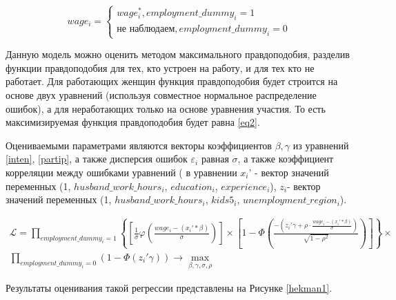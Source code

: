 \documentclass[a4paper,12pt]{article}
\begin{document}
\begin{equation*}
	wage_i= 
	\begin{cases}
		wage_i^*, 	employment\_dummy_i = 1 \\
		\text{не  наблюдаем}, employment\_dummy_i = 0
	\end{cases}
\end{equation*}

Данную модель можно оценить методом максимального правдоподобия, разделив функции правдоподобия для тех, кто устроен на работу, и для тех кто не работает. Для работающих женщин функция правдоподобия будет строится на основе двух уравнений (используя совместное нормальное распределение ошибок), а для неработающих только на основе уравнения участия. То есть максимизируемая функция правдоподобия будет равна \ref{eq2}.

Оцениваемыми параметрами являются векторы коэффициентов $\beta, \gamma$ из уравнений \ref{inten}, \ref{partip}, а также дисперсия ошибок $\varepsilon_i$ равная $\sigma$,  а также коэффициент корреляции между ошибками уравнений ( в уравнении  $x_i$'  -  вектор значений переменных (1, $husband\_work\_hours_i$, $education_i$, $experience_i$), $z_i$-  вектор значений переменных (1, $husband\_work\_hours_i$, $kids5_i$, $unemployment\_region_i$).

\begin{equation}\label{eq2}
	\begin{aligned}
		\mathcal{L} = \prod_{employment\_dummy_i = 1} \left\{
			\left[\frac{1}{\sigma} \varphi\left(\frac{wage_i-(x_i'*\beta)}{\sigma}\right)
			\right] \times 
		\left[1  - \Phi\left(\frac{-(z_i'\gamma+\rho \cdot \frac{wage_i-(x_i'*\beta )}{\sigma})}{\sqrt{1-\rho^2}}
		\right)
		\right]
		\right\}	 \times 
		\\
	\prod_{employment\_dummy_i = 0} (1 - \Phi(z_i'\gamma ))
	 \rightarrow \max_{\beta, \gamma, \sigma, \rho}
	\end{aligned}
\end{equation}



Результаты оценивания такой регрессии представлены на Рисунке \ref{hekman1}.
\end{document}
